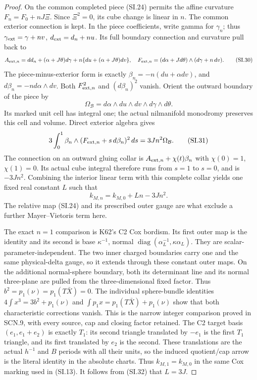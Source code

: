 \begin{proof}
On the common completed piece (SI.24) permits the affine
curvature \(F_n=F_0+nJ\Xi\). Since \(\Xi^2=0\), its cube change is
linear in \(n\). The common exterior connection is kept. In the
piece coefficients, write gamma for \(\gamma_n\); thus
\(\gamma_{\rm ext}=\gamma+nv\), \(d_{\rm ext}=d_n+nu\). Its full
boundary connection and curvature pull back to
\[
 A_{{\rm ext},n}=dd_n+(\alpha+J\theta)d\gamma
                         +n\{du+(\alpha+J\theta)dv\},
 \quad F_{{\rm ext},n}=(d\alpha+Jd\theta)
                                      \wedge(d\gamma+n\,dv).
                                                        \tag{SI.30}
\]
The piece-minus-exterior form is exactly
\(\beta_n=-n(du+\alpha dv)\), and \(d\beta_n=-n d\alpha\wedge dv\).
Both \(F_{{\rm ext},n}^2\) and \((d\beta_n)^2\) vanish. Orient the
outward boundary of the piece by
\[
 \Omega_{\mathcal B}=d\alpha\wedge du\wedge dv
                                    \wedge d\gamma\wedge d\theta.
\]
Its marked unit cell has integral one; the actual nilmanifold
monodromy preserves this cell and volume. Direct exterior algebra
gives
\[
 3\int_0^1\beta_n\wedge
            (F_{{\rm ext},n}+s\,d\beta_n)^2\,ds
                       =3J n^2\Omega_{\mathcal B}.     \tag{SI.31}
\]
The connection on an outward gluing collar is
\(A_{{\rm ext},n}+\chi(t)\beta_n\) with \(\chi(0)=1\), \(\chi(1)=0\).
Its actual cube integral therefore runs from \(s=1\) to \(s=0\),
and is \(-3Jn^2\). Combining the interior linear term with this
complete collar yields one fixed real constant \(L\) such that
\[
 k_{M,n}=k_{M,0}+Ln-3Jn^2.                           \tag{SI.32}
\]
The relative map (SI.24) and its prescribed outer gauge are what
exclude a further Mayer--Vietoris term here.

The exact \(n=1\) comparison is K62's C2 Cox bordism. Its first
outer map is the identity and its second is base \(\kappa^{-1}\),
normal \(\operatorname{diag}(\alpha_L^{-1},\kappa\alpha_L)\).
They are scalar-parameter-independent. The two inner charged
boundaries carry one and the same physical-delta gauge, so it
extends through these constant outer maps. On the additional
normal-sphere boundary, both its determinant line and its normal
three-plane are pulled from the three-dimensional fixed factor.
Thus \(b^2=p_1(\nu)=p_1(T\bar X)=0\). The individual sphere-bundle
identities \(4\int x^3=3b^2+p_1(\nu)\) and
\(\int p_1x=p_1(T\bar X)+p_1(\nu)\) show that both characteristic
corrections vanish. This is the narrow integer comparison proved
in SCN.9, with every source, cap and closing factor retained.
The C2 target basis \((e_1,e_1+e_2)\) is exactly \(T_1\):
its second triangle translated by \(-e_1\) is the first \(T_1\)
triangle, and its first translated by \(e_2\) is the second.
These translations are the actual \(h^{-1}\) and \(B\) periods with
all their units, so the induced quotient/cap arrow is the literal
identity in the absolute charts. Thus \(k_{M,1}=k_{M,0}\) in the
same Cox marking used in (SI.13). It follows from (SI.32) that
\(L=3J\).


\end{proof}
